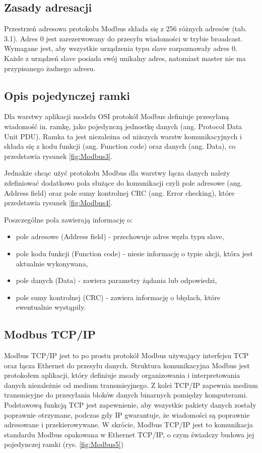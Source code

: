 \subsection{Zasady adresacji}

Przestrzeń adresowa protokołu Modbus składa się z 256 różnych adresów (tab. 3.1). Adres 0 jest zarezerwowany do przesyłu wiadomości w trybie broadcast. Wymagane jest, aby wszystkie urządzenia typu slave rozpoznawały adres 0. Każde z urządzeń slave posiada swój unikalny adres, natomiast master nie ma przypisanego żadnego adresu.


\subsection{Opis pojedynczej ramki}

Dla warstwy aplikacji modelu OSI protokół Modbus definiuje przesyłaną wiadomość in. ramkę, jako pojedynczą jednostkę danych (ang. Protocol Data Unit PDU). Ramka ta jest niezależna od niższych warstw komunikacyjnych i składa się z kodu funkcji (ang. Function code) oraz danych (ang. Data), co przedstawia rysunek \ref{fig:Modbus3}.


Jednakże chcąc użyć protokołu Modbus dla warstwy łącza danych należy zdefiniować dodatkowo pola służące do komunikacji czyli pole adresowe (ang. Address field) oraz pole sumy kontrolnej CRC (ang. Error checking), które przedstawia rysunek \ref{fig:Modbus4}.


Poszczególne pola zawierają informację o:

\begin{itemize}
	\item pole adresowe (Address field) - przechowuje adres węzła typu slave,
	\item pole kodu funkcji (Function code) - niesie informację o typie akcji, która jest aktualnie wykonywana,
	\item pole danych (Data) - zawiera parametry żądania lub odpowiedzi,
	\item pole sumy kontrolnej (CRC) - zawiera informację o błędach, które ewentualnie wystąpiły.
\end{itemize}


\subsection{Modbus TCP/IP}

Modbus TCP/IP jest to po prostu protokół Modbus używający interfejsu TCP oraz łącza Ethernet do przesyłu danych. Struktura komunikacyjna Modbus jest protokołem aplikacji, który definiuje zasady organizowania i interpretowania danych niezależnie od medium transmisyjnego. Z kolei TCP/IP zapewnia medium transmisyjne do przesyłania bloków danych binarnych pomiędzy komputerami. Podstawową funkcją TCP jest zapewnienie, aby wszystkie pakiety danych zostały poprawnie otrzymane, podczas gdy IP gwarantuje, że wiadomości są poprawnie adresowane i przekierowywane. W skrócie, Modbus TCP/IP jest to komunikacja standardu Modbus opakowana w Ethernet TCP/IP, o czym świadczy budowa jej pojedynczej ramki (rys. \ref{fig:Modbus5})



